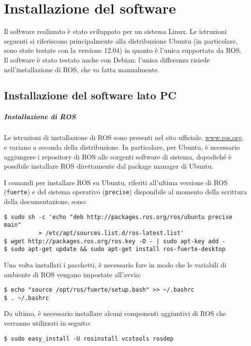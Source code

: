 \chapter{Installazione del software}
\label{cap:installazione}

Il software realizzato è stato sviluppato per un sistema Linux. Le istruzioni seguenti si riferiscono principalmente alla distribuzione Ubuntu (in particolare, sono state testate con la versione 12.04) in quanto è l'unica supportata da ROS. Il software è stato testato anche con Debian: l'unica differenza risiede nell'installazione di ROS, che va fatta manualmente.

\section{Installazione del software lato PC}
\paragraph{Installazione di ROS} Le istruzioni di installazione di ROS sono presenti nel sito ufficiale, \url{www.ros.org}, e variano a seconda della distribuzione. In particolare, per Ubuntu, è necessario aggiungere i repository di ROS alle sorgenti software di sistema, dopodiché è possibile installare ROS direttamente dal package manager di Ubuntu. 

\begin{nota} I comandi per installare ROS su Ubuntu, riferiti all'ultima versione di ROS (\verb|fuerte|) e del sistema operativo (\verb|precise|) disponibile al momento della scrittura della documentazione, sono:
\begin{verbatim}
$ sudo sh -c 'echo "deb http://packages.ros.org/ros/ubuntu precise main" 
          > /etc/apt/sources.list.d/ros-latest.list'
$ wget http://packages.ros.org/ros.key -O - | sudo apt-key add -
$ sudo apt-get update && sudo apt-get install ros-fuerte-desktop
\end{verbatim}
Una volta installati i pacchetti, è necessario fare in modo che le variabili di ambiente di ROS vengano impostate all'avvio:
\begin{verbatim}
$ echo "source /opt/ros/fuerte/setup.bash" >> ~/.bashrc
$ . ~/.bashrc
\end{verbatim}
Da ultimo, è necessario installare alcuni componenti aggiuntivi di ROS che verranno utilizzati in seguito:
\begin{verbatim}
$ sudo easy_install -U rosinstall vcstools rosdep
\end{verbatim}
\end{nota}

